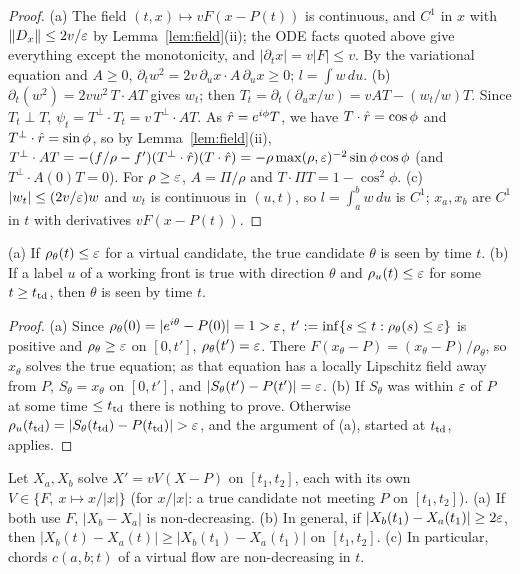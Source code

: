 \begin{proof}
(a) The field $(t,x)\mapsto vF(x-P(t))$ is continuous, and $C^1$ in $x$ with $\|D_x\|\le2v/\varepsilon$ by Lemma~\ref{lem:field}(ii);
the ODE facts quoted above give everything except the monotonicity, and $|\partial_tx|=v|F|\le v$. By the variational equation
and $A\ge0$, $\partial_tw^2=2v\,\partial_ux\cdot A\,\partial_ux\ge0$; $l=\int w\,du$.
(b) $\partial_t(w^2)=2vw^2\,T\cdot AT$ gives $w_t$; then $T_t=\partial_t(\partial_ux/w)=vAT-(w_t/w)T$. Since $T_t\perp T$,
$\psi_t=T^\perp\cdot T_t=v\,T^\perp\cdot AT$. As $\hat r=e^{i\phi}T$, we have $T\cdot\hat r=\cos\phi$ and $T^\perp\cdot\hat r=\sin\phi$,
so by Lemma~\ref{lem:field}(ii), $T^\perp\cdot AT=-(f/\rho-f')(T^\perp\cdot\hat r)(T\cdot\hat r)=-\rho\max(\rho,\varepsilon)^{-2}\sin\phi\cos\phi$
(and $T^\perp\cdot A(0)T=0$). For $\rho\ge\varepsilon$, $A=\Pi/\rho$ and $T\cdot\Pi T=1-\cos^2\phi$.
(c) $|w_t|\le(2v/\varepsilon)w$ and $w_t$ is continuous in $(u,t)$, so $l=\int_a^bw\,du$ is $C^1$; $x_a,x_b$ are $C^1$ in $t$ with
derivatives $vF(x-P(t))$.
\end{proof}

\begin{lemma}\label{lem:seen}
\textup{(a)} If $\rho_\theta(t)\le\varepsilon$ for a virtual candidate, the true candidate $\theta$ is seen by time $t$.
\textup{(b)} If a label $u$ of a working front is true with direction $\theta$ and $\rho_u(t)\le\varepsilon$ for some $t\ge t_{\mathrm{td}}$, then
$\theta$ is seen by time $t$.
\end{lemma}

\begin{proof}
(a) Since $\rho_\theta(0)=|e^{i\theta}-P(0)|=1>\varepsilon$, $t':=\inf\{s\le t:\rho_\theta(s)\le\varepsilon\}$ is positive and
$\rho_\theta\ge\varepsilon$ on $[0,t']$, $\rho_\theta(t')=\varepsilon$. There $F(x_\theta-P)=(x_\theta-P)/\rho_\theta$, so $x_\theta$ solves the
true equation; as that equation has a locally Lipschitz field away from $P$, $S_\theta=x_\theta$ on $[0,t']$, and
$|S_\theta(t')-P(t')|=\varepsilon$. (b) If $S_\theta$ was within $\varepsilon$ of $P$ at some time $\le t_{\mathrm{td}}$ there is nothing to prove.
Otherwise $\rho_u(\ttd)=|S_\theta(\ttd)-P(\ttd)|>\eps$, and the argument of (a), started at $t_{\mathrm{td}}$, applies.
\end{proof}

\begin{lemma}\label{lem:sep}
Let $X_a,X_b$ solve $X'=vV(X-P)$ on $[t_1,t_2]$, each with its own $V\in\{F,\ x\mapsto x/|x|\}$ \textup(for $x/|x|$: a true
candidate not meeting $P$ on $[t_1,t_2]$\textup).
\textup{(a)} If both use $F$, $|X_b-X_a|$ is non-decreasing.
\textup{(b)} In general, if $|X_b(t_1)-X_a(t_1)|\ge2\varepsilon$, then $|X_b(t)-X_a(t)|\ge|X_b(t_1)-X_a(t_1)|$ on $[t_1,t_2]$.
\textup{(c)} In particular, chords $c(a,b;t)$ of a virtual flow are non-decreasing in $t$.
\end{lemma}

